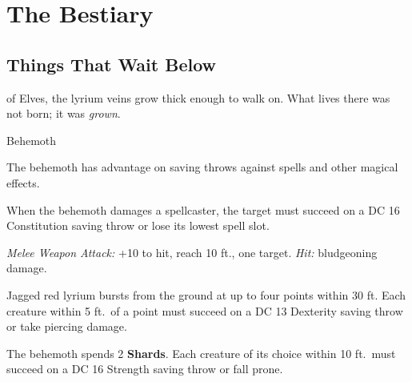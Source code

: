 \documentclass{apotheosis-book} %
\begin{document}
\part{The Bestiary}

\chapter{Things That Wait Below}

\begin{segment}
 of Elves, the lyrium veins grow thick enough
to walk on. What lives there was not born; it was \emph{grown}.

\begin{monster}{Behemoth}
\basics[
  armorclass = 10 (lyrium hide),
  hitpoints  = \rpgdice{16d10+32},
  speed      = 35 ft.
]
\monsterrule
\stats[
  STR = \stat{26}, DEX = \stat{10}, CON = \stat{26},
  INT = \stat{8},  WIS = \stat{12}, CHA = \stat{8}
]
\monsterrule
\details[
  skills    = Athletics +10,
  senses    = passive Perception 11,
  languages = understands Common but can't speak,
  challenge = 10
]
\monsterrule
\begin{monsteraction}
  The behemoth has advantage on saving throws against spells and other
  magical effects.
\end{monsteraction}
\begin{monsteraction}
  When the behemoth damages a spellcaster, the target must succeed on a
  DC 16 Constitution saving throw or lose its lowest spell slot.
\end{monsteraction}

\begin{monsteraction}[Bash]
  \emph{Melee Weapon Attack:} +10 to hit, reach 10 ft., one target.
  \emph{Hit:}  bludgeoning damage.
\end{monsteraction}
\begin{monsteraction}
  Jagged red lyrium bursts from the ground at up to four points within
  30 ft. Each creature within 5 ft.\ of a point must succeed on a DC 13
  Dexterity saving throw or take  piercing damage.
\end{monsteraction}

\begin{monsteraction}[Quake]
  The behemoth spends 2 \textbf{Shards}. Each creature of its choice within
  10 ft.\ must succeed on a DC 16 Strength saving throw or fall prone.
\end{monsteraction}
\end{monster}


\end{segment}
\end{document}

